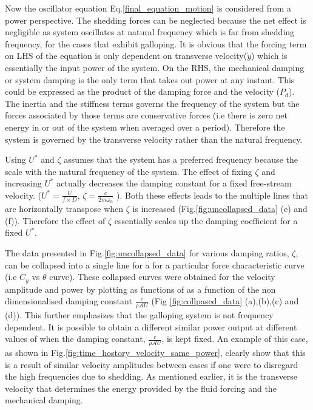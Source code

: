  Now the oscillator equation Eq.\eqref{final_equation_motion} is considered from a power perspective. The shedding forces can be neglected because the net effect is negligible as system oscillates at natural frequency which is far from shedding frequency, for the cases that exhibit galloping. It is obvious that the forcing term on LHS of the equation is only dependent on transverse velocity($\dot{y}$) which is essentially the input power of the system. On the RHS, the mechanical damping or system damping is the only term that takes out power at any instant. This could be expressed as the product of the damping force and the velocity ($P_d$). The inertia and the stiffness terms governs the frequency of the system but the forces associated by those terms are conservative forces (i.e there is zero net energy in or out of the system when averaged over a period). Therefore the system is governed by the transverse velocity rather than the natural frequency.
 

 Using $U^*$ and $\zeta$ assumes that the system has a preferred frequency because the scale with the natural frequency of the system. The effect of fixing $\zeta$ and increasing $U^*$ actually decreases the damping constant for a fixed free-stream velocity. ($U^*=\frac{U}{f \times D}$, $\zeta= \frac{c}{2 m \omega_n}$ ). Both these effects leads to the multiple lines that are horizontally transpose when $\zeta$ is increased (Fig.\ref{fig:uncollapsed_data} (e) and (f)). Therefore the effect of $\zeta$ essentially scales up the damping coefficient for a fixed $U^*$.
 
 The data presented in Fig.\ref{fig:uncollapsed_data} for various damping ratios, $\zeta$, can be collapsed into a single line for a for a particular force characteristic curve (i.e $C_y$ vs $\theta$ curve). These collapsed curves were  obtained for the velocity amplitude  and power by plotting as functions of as a function of  the non dimensionalised  damping constant $\frac{c}{\rho\mathcal{A}U}$ 
(Fig \ref{fig:collpased_data} (a),(b),(c) and (d)).  This further emphasizes that the galloping system is not frequency dependent. It is possible to obtain a different similar power output at different values of \ustar when the damping constant, $\frac{c}{\rho\mathcal{A}U}$, is kept fixed. An example of this case, as shown in Fig.\ref{fig:time_hostory_velocity_same_power}, clearly show that this is a result of similar velocity amplitudes between cases if one were to disregard the high frequencies due to shedding. As mentioned earlier, it is the transverse velocity that determines the energy provided by the fluid forcing and the mechanical damping.

